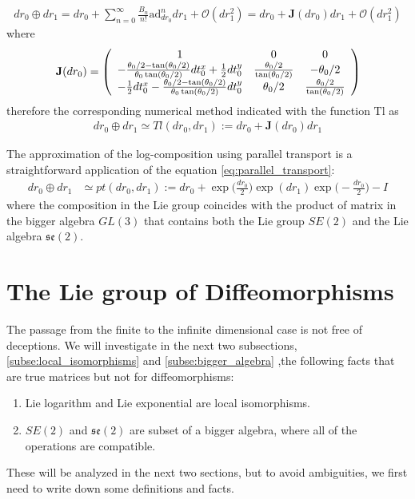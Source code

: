 \begin{align}
dr_{0}\oplus dr_{1}
=
dr_{0}
+
\sum_{n=0}^{\infty} \frac{B_{n}}{n!} \text{ad}_{dr_{0}}^{ n} 
dr_{1}
+
\mathcal{O}(dr_{1}^2)
=
dr_{0}
+
\mathbf{J}(dr_{0})
dr_{1}
+
\mathcal{O}(dr_{1}^2)
\end{align}
where 
\begin{align*}
\mathbf{J}(dr_{0})
=
\left (
\begin{array} {c c c}
1            &  0        &      0
\\
-\frac{\theta_0/2 - \tan(\theta_0/2)}{\theta_0\tan(\theta_0/2)}  dt^{x}_0 + \frac{1}{2}dt^{y}_0       
&  \frac{\theta_0 /2}{\tan(\theta_0/2)} 
& - \theta_0/2 
\\
-  \frac{1}{2} dt^{x}_0 -\frac{\theta_0/2 - \tan(\theta_0/2)}{\theta_0\tan(\theta_0/2)} dt^{y}_0       
& \theta_0/2 
&  \frac{\theta_0 /2}{\tan(\theta_0/2)}
\end{array}
\right )
\end{align*}
therefore the corresponding numerical method indicated with the function $\text{Tl}$ as
\begin{align}\label{eq:taylor_se2}
dr_{0}\oplus dr_{1}
\simeq
Tl(dr_{0}, dr_{1})
:=
dr_{0}
+
\mathbf{J}(dr_{0})
dr_{1}
\end{align}

The approximation of the log-composition using parallel transport is a straightforward application of the equation \ref{eq:parallel_transport}: 
\begin{align}\label{eq:parallel_transport_se2}
dr_{0}\oplus dr_{1}
&\simeq
pt(dr_{0}, dr_{1}) 
:=
dr_{0}
+
\exp\big(\frac{dr_{0}}{2}\big)   
\exp(dr_{1}) 
\exp\big(-\frac{dr_{0}}{2}\big)
-
I
\end{align}
where the composition in the Lie group coincides with the product of matrix in the bigger algebra $GL(3)$ that contains both the Lie group $SE(2)$ and the Lie algebra $\mathfrak{se}(2)$.


\section{The Lie group of Diffeomorphisms}\label{se:svf}


The passage from the finite to the infinite dimensional case is not free of deceptions. We will investigate in the next two subsections, \ref{subse:local_isomorphisms} and \ref{subse:bigger_algebra} ,the following facts that are true matrices but not for diffeomorphisms:
\begin{enumerate}
	\item Lie logarithm and Lie exponential are local isomorphisms.
	\item $SE(2)$ and $\mathfrak{se}(2)$ are subset of a bigger algebra, where all of the operations are compatible.
\end{enumerate}
These will be analyzed in the next two sections, but to avoid ambiguities, we first need to write down some definitions and facts.

